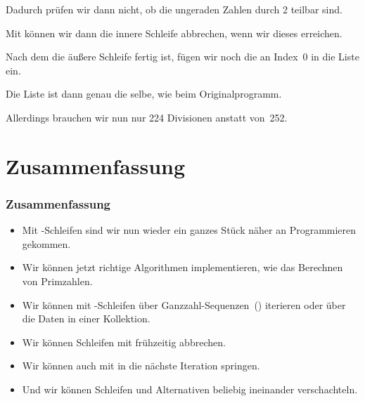 \documentclass[aspectratio=169,mathserif,notheorems]{beamer}%
\begin{document}
\begin{frame}[t]
{{\begin{itemize}
{\item<15-> Dadurch prüfen wir dann nicht, ob die ungeraden Zahlen  durch 2 teilbar sind.%
}%
%
%
%
%
%
\item<20-> Mit  können wir dann die innere Schleife abbrechen, wenn wir dieses  erreichen.%
%
\item<21-> Nach dem die äußere Schleife fertig ist, fügen wir noch die  an Index~0 in die Liste ein.%
%
\item<22-> Die Liste ist dann genau die selbe, wie beim Originalprogramm.%
%
\item<23-> Allerdings brauchen wir nun nur 224 Divisionen anstatt von~252.
\end{itemize}%
}}%
%
%
%
%
%
\end{frame}%
%
\section{Zusammenfassung}%
%
\begin{frame}%
\frametitle{Zusammenfassung}%
\begin{itemize}%
\item Mit -Schleifen sind wir nun wieder ein ganzes Stück näher an  Programmieren gekommen.%
%
\item<2-> Wir können jetzt richtige Algorithmen implementieren, wie das Berechnen von Primzahlen.%
%
\item<3-> Wir können mit -Schleifen über Ganzzahl-Sequenzen~() iterieren oder über die Daten in einer Kollektion.%
%
\item<4-> Wir können Schleifen mit  frühzeitig abbrechen.%
%
\item<5-> Wir können auch mit  in die nächste Iteration springen.%
%
\item<6-> Und wir können Schleifen und Alternativen beliebig ineinander verschachteln.%
\end{itemize}%
\end{frame}%
%
\endPresentation%
\end{document}
